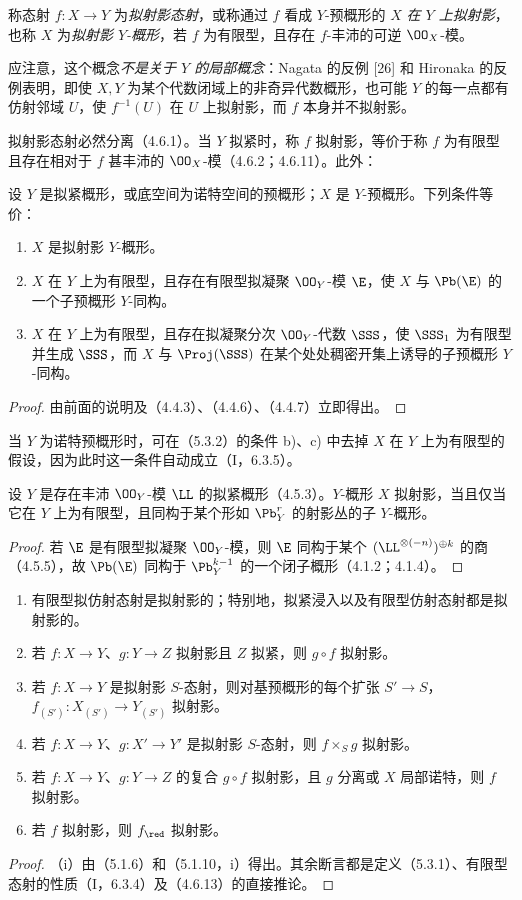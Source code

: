 称态射 $f:X\to Y$ 为\emph{拟射影态射}，或称通过 $f$ 看成 $Y$-预概形的 $X$ \emph{在 $Y$ 上拟射影}，也称 $X$ 为\emph{拟射影 $Y$-概形}，若 $f$ 为有限型，且存在 $f$-丰沛的可逆 $\OO_X$-模。

应注意，这个概念\emph{不是关于 $Y$ 的局部概念}：Nagata 的反例 [26] 和 Hironaka 的反例表明，即使 $X,Y$ 为某个代数闭域上的非奇异代数概形，也可能 $Y$ 的每一点都有仿射邻域 $U$，使 $f^{-1}(U)$ 在 $U$ 上拟射影，而 $f$ 本身并不拟射影。

拟射影态射必然分离（4.6.1）。当 $Y$ 拟紧时，称 $f$ 拟射影，等价于称 $f$ 为有限型且存在相对于 $f$ 甚丰沛的 $\OO_X$-模（4.6.2；4.6.11）。此外：

设 $Y$ 是拟紧概形，或底空间为诺特空间的预概形；$X$ 是 $Y$-预概形。下列条件等价：
\begin{enumerate}[label=\alph*)]
\item $X$ 是拟射影 $Y$-概形。
\item $X$ 在 $Y$ 上为有限型，且存在有限型拟凝聚 $\OO_Y$-模 $\E$，使 $X$ 与 $\Pb(\E)$ 的一个子预概形 $Y$-同构。
\item $X$ 在 $Y$ 上为有限型，且存在拟凝聚分次 $\OO_Y$-代数 $\SSS$，使 $\SSS_1$ 为有限型并生成 $\SSS$，而 $X$ 与 $\Proj(\SSS)$ 在某个处处稠密开集上诱导的子预概形 $Y$-同构。
\end{enumerate}
\begin{proof}
由前面的说明及（4.4.3）、（4.4.6）、（4.4.7）立即得出。
\end{proof}
当 $Y$ 为诺特预概形时，可在（5.3.2）的条件 b)、c) 中去掉 $X$ 在 $Y$ 上为有限型的假设，因为此时这一条件自动成立（I，6.3.5）。

设 $Y$ 是存在丰沛 $\OO_Y$-模 $\LL$ 的拟紧概形（4.5.3）。$Y$-概形 $X$ 拟射影，当且仅当它在 $Y$ 上为有限型，且同构于某个形如 $\Pb_Y^r$ 的射影丛的子 $Y$-概形。
\begin{proof}
若 $\E$ 是有限型拟凝聚 $\OO_Y$-模，则 $\E$ 同构于某个
$(\LL^{\otimes(-n)})^{\oplus k}$ 的商（4.5.5），故 $\Pb(\E)$ 同构于 $\Pb_Y^{k-1}$ 的一个闭子概形（4.1.2；4.1.4）。
\end{proof}

\begin{enumerate}[label=\textup{(\roman*)}]
\item 有限型拟仿射态射是拟射影的；特别地，拟紧浸入以及有限型仿射态射都是拟射影的。
\item 若 $f:X\to Y$、$g:Y\to Z$ 拟射影且 $Z$ 拟紧，则 $g\circ f$ 拟射影。
\item 若 $f:X\to Y$ 是拟射影 $S$-态射，则对基预概形的每个扩张 $S'\to S$，$f_{(S')}:X_{(S')}\to Y_{(S')}$ 拟射影。
\item 若 $f:X\to Y$、$g:X'\to Y'$ 是拟射影 $S$-态射，则 $f\times_Sg$ 拟射影。
\item 若 $f:X\to Y$、$g:Y\to Z$ 的复合 $g\circ f$ 拟射影，且 $g$ 分离或 $X$ 局部诺特，则 $f$ 拟射影。
\item 若 $f$ 拟射影，则 $f_{\red}$ 拟射影。
\end{enumerate}
\begin{proof}
（i）由（5.1.6）和（5.1.10，i）得出。其余断言都是定义（5.3.1）、有限型态射的性质（I，6.3.4）及（4.6.13）的直接推论。
\end{proof}


